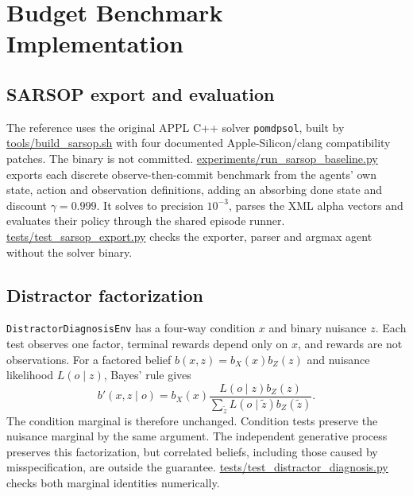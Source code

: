 \section{Budget Benchmark Implementation}
\label{app:budget_supp}

\subsection{SARSOP export and evaluation}
\label{app:sarsop_build}

The reference uses the original APPL C++ solver \texttt{pomdpsol}, built by \url{tools/build_sarsop.sh} with four documented Apple-Silicon/clang compatibility patches. The binary is not committed. \url{experiments/run_sarsop_baseline.py} exports each discrete observe-then-commit benchmark from the agents' own state, action and observation definitions, adding an absorbing done state and discount $\gamma=0.999$. It solves to precision $10^{-3}$, parses the XML alpha vectors and evaluates their policy through the shared episode runner. \url{tests/test_sarsop_export.py} checks the exporter, parser and argmax agent without the solver binary.

\subsection{Distractor factorization}
\label{app:distractor}

\texttt{DistractorDiagnosisEnv} has a four-way condition $x$ and binary nuisance $z$. Each test observes one factor, terminal rewards depend only on $x$, and rewards are not observations. For a factored belief $b(x,z)=b_X(x)b_Z(z)$ and nuisance likelihood $L(o\mid z)$, Bayes' rule gives
\[
b'(x,z\mid o)=b_X(x)\frac{L(o\mid z)b_Z(z)}{\sum_{\tilde z}L(o\mid\tilde z)b_Z(\tilde z)}.
\]
The condition marginal is therefore unchanged. Condition tests preserve the nuisance marginal by the same argument. The independent generative process preserves this factorization, but correlated beliefs, including those caused by misspecification, are outside the guarantee. \url{tests/test_distractor_diagnosis.py} checks both marginal identities numerically.

\FloatBarrier

